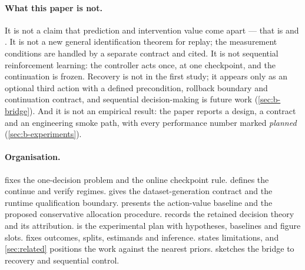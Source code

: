 \paragraph{What this paper is not.}
It is not a claim that prediction and intervention value come apart --- that is
\citet{interventionparadox2026} and \citet{calibrationnotcontrol2026}.  It is
not a new general identification theorem for replay; the measurement conditions
are handled by a separate contract and cited.  It is not sequential
reinforcement learning: the controller acts once, at one checkpoint, and the
continuation is frozen.  Recovery is not in the first study; it appears only as
an optional third action with a defined precondition, rollback boundary and
continuation contract, and sequential decision-making is future work
(\cref{sec:b-bridge}).  And it is not an empirical result: the paper reports a
design, a contract and an engineering smoke path, with every performance number
marked \emph{planned} (\cref{sec:b-experiments}).

\paragraph{Organisation.}
 fixes the one-decision problem and the online checkpoint
rule.   defines the continue and verify regimes.
 gives the dataset-generation contract and the runtime
qualification boundary.   presents the action-value baseline
and the proposed conservative allocation procedure.  
records the retained decision theory and its attribution.
 is the experimental plan with hypotheses, baselines
and figure slots.   fixes outcomes, splits, estimands
and inference.   states limitations, and
\cref{sec:related} positions the work against the nearest priors.
 sketches the bridge to recovery and sequential control.

